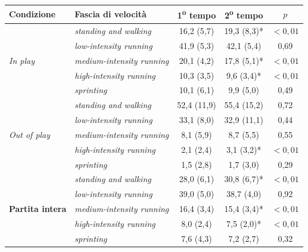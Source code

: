 \begin{center}
\footnotesize
\begin{tabular}{|l|l|c|c|c|}
\hline
\textbf{Condizione} & \textbf{Fascia di velocità} & \textbf{1\textsuperscript{o} tempo} & \textbf{2\textsuperscript{o} tempo} & \textbf{$p$} \\
\hline
\multirow{5}{*}{\textit{In play}}
  & \textit{standing and walking}      & 16,2 (5,7)  & 19,3 (8,3)*  & $<0{,}01$ \\
  & \textit{low-intensity running}     & 41,9 (5,3)  & 42,1 (5,4)   & 0,69 \\
  & \textit{medium-intensity running}  & 20,1 (4,2)  & 17,8 (5,1)*  & $<0{,}01$ \\
  & \textit{high-intensity running}    & 10,3 (3,5)  & 9,6 (3,4)*   & $<0{,}01$ \\
  & \textit{sprinting}                 & 10,1 (6,1)  & 9,9 (5,0)    & 0,49 \\
\hline
\multirow{5}{*}{\textit{Out of play}}
  & \textit{standing and walking}      & 52,4 (11,9) & 55,4 (15,2)  & 0,72 \\
  & \textit{low-intensity running}     & 33,1 (8,0)  & 32,9 (11,1)  & 0,44 \\
  & \textit{medium-intensity running}  & 8,1 (5,9)   & 8,7 (5,5)    & 0,55 \\
  & \textit{high-intensity running}    & 2,1 (2,4)   & 3,1 (3,2)*   & $<0{,}01$ \\
  & \textit{sprinting}                 & 1,5 (2,8)   & 1,7 (3,0)    & 0,29 \\
\hline
\multirow{5}{*}{\textbf{Partita intera}}
  & \textit{standing and walking}      & 28,0 (6,1)  & 30,8 (6,7)*  & $<0{,}01$ \\
  & \textit{low-intensity running}     & 39,0 (5,0)  & 38,7 (4,0)   & 0,92 \\
  & \textit{medium-intensity running}  & 16,4 (3,4)  & 15,4 (3,4)*  & $<0{,}01$ \\
  & \textit{high-intensity running}    & 8,0 (2,4)   & 7,5 (2,0)*   & $<0{,}01$ \\
  & \textit{sprinting}                 & 7,6 (4,3)   & 7,2 (2,7)    & 0,32 \\
\hline
\end{tabular}
\end{center}

